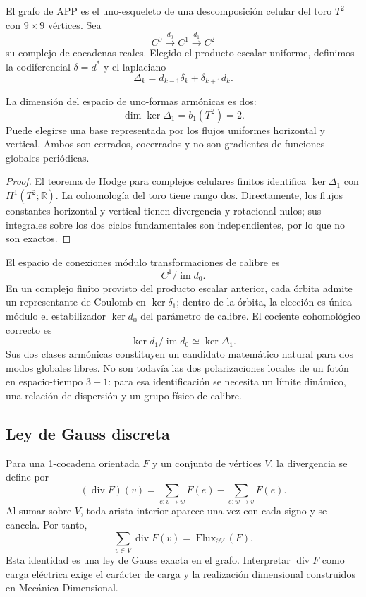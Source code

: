 El grafo de APP es el uno-esqueleto de una descomposición celular del toro
\(T^2\) con \(9\times9\) vértices. Sea
\[
 C^0\xrightarrow{d_0}C^1\xrightarrow{d_1}C^2
\]
su complejo de cocadenas reales. Elegido el producto escalar uniforme,
definimos la codiferencial \(\delta=d^*\) y el laplaciano
\[
 \Delta_k=d_{k-1}\delta_k+\delta_{k+1}d_k.
\]

\begin{theorem}
\label{v:v:rec:completaciones:statement:04}
La dimensión del espacio de uno-formas armónicas es dos:
\[
 \dim\ker\Delta_1=b_1(T^2)=2.
\]
Puede elegirse una base representada por los flujos uniformes horizontal y
vertical. Ambos son cerrados, cocerrados y no son gradientes de funciones
globales periódicas.
\end{theorem}

\begin{proof}
El teorema de Hodge para complejos celulares finitos identifica
\(\ker\Delta_1\) con \(H^1(T^2;\mathbb R)\). La cohomología del toro tiene
rango dos. Directamente, los flujos constantes horizontal y vertical tienen
divergencia y rotacional nulos; sus integrales sobre los dos ciclos
fundamentales son independientes, por lo que no son exactos.
\end{proof}

El espacio de conexiones módulo transformaciones de calibre es
\[
 C^1/\operatorname{im}d_0.
\]
En un complejo finito provisto del producto escalar anterior, cada órbita
admite un representante de Coulomb en \(\ker\delta_1\); dentro de la órbita,
la elección es única módulo el estabilizador \(\ker d_0\) del parámetro de
calibre. El cociente cohomológico correcto es
\[
 \ker d_1/\operatorname{im}d_0
 \simeq \ker\Delta_1 .
\]
Sus dos clases armónicas constituyen un candidato matemático natural para
dos modos globales libres. No son todavía las dos polarizaciones locales de
un fotón en espacio-tiempo \(3+1\): para esa identificación se necesita un
límite dinámico, una relación de dispersión y un grupo físico de calibre.

\subsection{Ley de Gauss discreta}
\label{v:v:rec:completaciones:section:09}

Para una 1-cocadena orientada \(F\) y un conjunto de vértices \(V\), la
divergencia se define por
\[
 (\operatorname{div}F)(v)=
 \sum_{e:v\to w}F(e)-\sum_{e:w\to v}F(e).
\]
Al sumar sobre \(V\), toda arista interior aparece una vez con cada signo y
se cancela. Por tanto,
\[
 \boxed{
 \sum_{v\in V}\operatorname{div}F(v)
 =\operatorname{Flux}_{\partial V}(F).}
\]
Esta identidad es una ley de Gauss exacta en el grafo. Interpretar
\(\operatorname{div}F\) como carga eléctrica exige el carácter de carga y la
realización dimensional construidos en Mecánica Dimensional.

